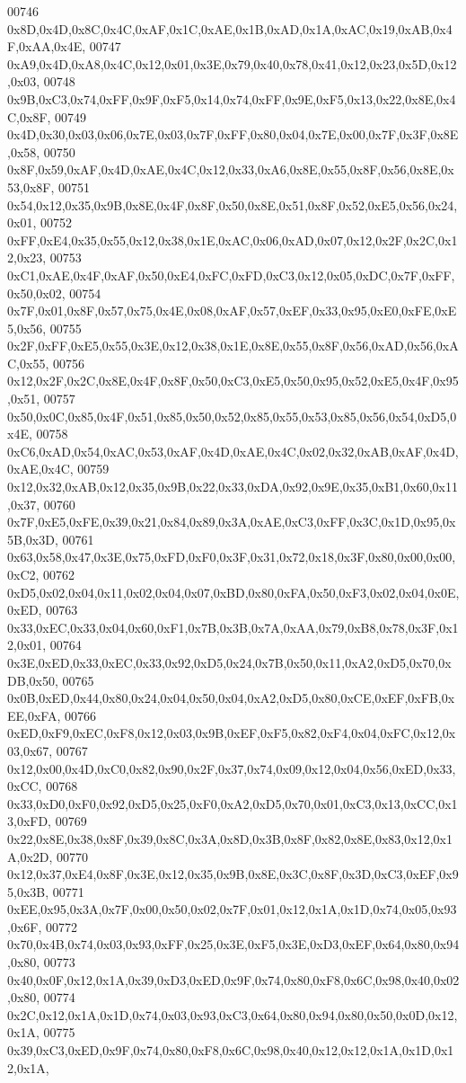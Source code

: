 \begin{DoxyCode}
00746 0x8D,0x4D,0x8C,0x4C,0xAF,0x1C,0xAE,0x1B,0xAD,0x1A,0xAC,0x19,0xAB,0x4F,0xAA,0x4E,
00747 0xA9,0x4D,0xA8,0x4C,0x12,0x01,0x3E,0x79,0x40,0x78,0x41,0x12,0x23,0x5D,0x12,0x03,
00748 0x9B,0xC3,0x74,0xFF,0x9F,0xF5,0x14,0x74,0xFF,0x9E,0xF5,0x13,0x22,0x8E,0x4C,0x8F,
00749 0x4D,0x30,0x03,0x06,0x7E,0x03,0x7F,0xFF,0x80,0x04,0x7E,0x00,0x7F,0x3F,0x8E,0x58,
00750 0x8F,0x59,0xAF,0x4D,0xAE,0x4C,0x12,0x33,0xA6,0x8E,0x55,0x8F,0x56,0x8E,0x53,0x8F,
00751 0x54,0x12,0x35,0x9B,0x8E,0x4F,0x8F,0x50,0x8E,0x51,0x8F,0x52,0xE5,0x56,0x24,0x01,
00752 0xFF,0xE4,0x35,0x55,0x12,0x38,0x1E,0xAC,0x06,0xAD,0x07,0x12,0x2F,0x2C,0x12,0x23,
00753 0xC1,0xAE,0x4F,0xAF,0x50,0xE4,0xFC,0xFD,0xC3,0x12,0x05,0xDC,0x7F,0xFF,0x50,0x02,
00754 0x7F,0x01,0x8F,0x57,0x75,0x4E,0x08,0xAF,0x57,0xEF,0x33,0x95,0xE0,0xFE,0xE5,0x56,
00755 0x2F,0xFF,0xE5,0x55,0x3E,0x12,0x38,0x1E,0x8E,0x55,0x8F,0x56,0xAD,0x56,0xAC,0x55,
00756 0x12,0x2F,0x2C,0x8E,0x4F,0x8F,0x50,0xC3,0xE5,0x50,0x95,0x52,0xE5,0x4F,0x95,0x51,
00757 0x50,0x0C,0x85,0x4F,0x51,0x85,0x50,0x52,0x85,0x55,0x53,0x85,0x56,0x54,0xD5,0x4E,
00758 0xC6,0xAD,0x54,0xAC,0x53,0xAF,0x4D,0xAE,0x4C,0x02,0x32,0xAB,0xAF,0x4D,0xAE,0x4C,
00759 0x12,0x32,0xAB,0x12,0x35,0x9B,0x22,0x33,0xDA,0x92,0x9E,0x35,0xB1,0x60,0x11,0x37,
00760 0x7F,0xE5,0xFE,0x39,0x21,0x84,0x89,0x3A,0xAE,0xC3,0xFF,0x3C,0x1D,0x95,0x5B,0x3D,
00761 0x63,0x58,0x47,0x3E,0x75,0xFD,0xF0,0x3F,0x31,0x72,0x18,0x3F,0x80,0x00,0x00,0xC2,
00762 0xD5,0x02,0x04,0x11,0x02,0x04,0x07,0xBD,0x80,0xFA,0x50,0xF3,0x02,0x04,0x0E,0xED,
00763 0x33,0xEC,0x33,0x04,0x60,0xF1,0x7B,0x3B,0x7A,0xAA,0x79,0xB8,0x78,0x3F,0x12,0x01,
00764 0x3E,0xED,0x33,0xEC,0x33,0x92,0xD5,0x24,0x7B,0x50,0x11,0xA2,0xD5,0x70,0xDB,0x50,
00765 0x0B,0xED,0x44,0x80,0x24,0x04,0x50,0x04,0xA2,0xD5,0x80,0xCE,0xEF,0xFB,0xEE,0xFA,
00766 0xED,0xF9,0xEC,0xF8,0x12,0x03,0x9B,0xEF,0xF5,0x82,0xF4,0x04,0xFC,0x12,0x03,0x67,
00767 0x12,0x00,0x4D,0xC0,0x82,0x90,0x2F,0x37,0x74,0x09,0x12,0x04,0x56,0xED,0x33,0xCC,
00768 0x33,0xD0,0xF0,0x92,0xD5,0x25,0xF0,0xA2,0xD5,0x70,0x01,0xC3,0x13,0xCC,0x13,0xFD,
00769 0x22,0x8E,0x38,0x8F,0x39,0x8C,0x3A,0x8D,0x3B,0x8F,0x82,0x8E,0x83,0x12,0x1A,0x2D,
00770 0x12,0x37,0xE4,0x8F,0x3E,0x12,0x35,0x9B,0x8E,0x3C,0x8F,0x3D,0xC3,0xEF,0x95,0x3B,
00771 0xEE,0x95,0x3A,0x7F,0x00,0x50,0x02,0x7F,0x01,0x12,0x1A,0x1D,0x74,0x05,0x93,0x6F,
00772 0x70,0x4B,0x74,0x03,0x93,0xFF,0x25,0x3E,0xF5,0x3E,0xD3,0xEF,0x64,0x80,0x94,0x80,
00773 0x40,0x0F,0x12,0x1A,0x39,0xD3,0xED,0x9F,0x74,0x80,0xF8,0x6C,0x98,0x40,0x02,0x80,
00774 0x2C,0x12,0x1A,0x1D,0x74,0x03,0x93,0xC3,0x64,0x80,0x94,0x80,0x50,0x0D,0x12,0x1A,
00775 0x39,0xC3,0xED,0x9F,0x74,0x80,0xF8,0x6C,0x98,0x40,0x12,0x12,0x1A,0x1D,0x12,0x1A,

\end{DoxyCode}
